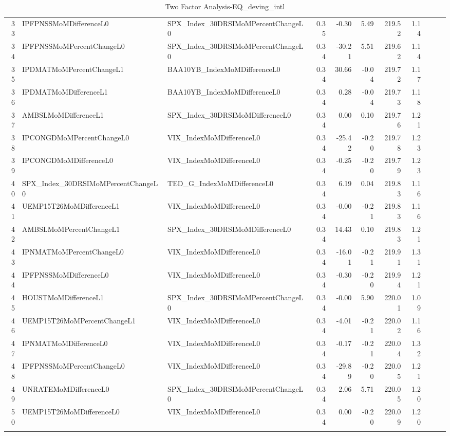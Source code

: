 \begin{longtable}{rllrrrrrlll}
  33 & IPFPNSSMoMDifferenceL0 & SPX\_Index\_30DRSIMoMPercentChangeL0 & 0.35 & -0.30 & 5.49 & 219.52 & 1.14 &  &  &  \\ 
  34 & IPFPNSSMoMPercentChangeL0 & SPX\_Index\_30DRSIMoMPercentChangeL0 & 0.34 & -30.21 & 5.51 & 219.62 & 1.14 &  &  &  \\ 
  35 & IPDMATMoMPercentChangeL1 & BAA10YB\_IndexMoMDifferenceL0 & 0.34 & 30.66 & -0.04 & 219.72 & 1.17 &  &  &  \\ 
  36 & IPDMATMoMDifferenceL1 & BAA10YB\_IndexMoMDifferenceL0 & 0.34 & 0.28 & -0.04 & 219.73 & 1.18 &  &  &  \\ 
  37 & AMBSLMoMDifferenceL1 & SPX\_Index\_30DRSIMoMDifferenceL0 & 0.34 & 0.00 & 0.10 & 219.76 & 1.21 &  &  &  \\ 
  38 & IPCONGDMoMPercentChangeL0 & VIX\_IndexMoMDifferenceL0 & 0.34 & -25.42 & -0.20 & 219.78 & 1.23 &  &  &  \\ 
  39 & IPCONGDMoMDifferenceL0 & VIX\_IndexMoMDifferenceL0 & 0.34 & -0.25 & -0.20 & 219.79 & 1.23 &  &  &  \\ 
  40 & SPX\_Index\_30DRSIMoMPercentChangeL0 & TED\_G\_IndexMoMDifferenceL0 & 0.34 & 6.19 & 0.04 & 219.83 & 1.16 &  &  &  \\ 
  41 & UEMP15T26MoMDifferenceL1 & VIX\_IndexMoMDifferenceL0 & 0.34 & -0.00 & -0.21 & 219.83 & 1.16 &  &  &  \\ 
  42 & AMBSLMoMPercentChangeL1 & SPX\_Index\_30DRSIMoMDifferenceL0 & 0.34 & 14.43 & 0.10 & 219.83 & 1.21 &  &  &  \\ 
  43 & IPNMATMoMPercentChangeL0 & VIX\_IndexMoMDifferenceL0 & 0.34 & -16.01 & -0.21 & 219.91 & 1.31 &  &  &  \\ 
  44 & IPFPNSSMoMDifferenceL0 & VIX\_IndexMoMDifferenceL0 & 0.34 & -0.30 & -0.20 & 219.94 & 1.21 &  &  &  \\ 
  45 & HOUSTMoMDifferenceL1 & SPX\_Index\_30DRSIMoMPercentChangeL0 & 0.34 & -0.00 & 5.90 & 220.01 & 1.09 &  &  &  \\ 
  46 & UEMP15T26MoMPercentChangeL1 & VIX\_IndexMoMDifferenceL0 & 0.34 & -4.01 & -0.21 & 220.02 & 1.16 &  &  &  \\ 
  47 & IPNMATMoMDifferenceL0 & VIX\_IndexMoMDifferenceL0 & 0.34 & -0.17 & -0.21 & 220.04 & 1.32 &  &  &  \\ 
  48 & IPFPNSSMoMPercentChangeL0 & VIX\_IndexMoMDifferenceL0 & 0.34 & -29.89 & -0.20 & 220.05 & 1.21 &  &  &  \\ 
  49 & UNRATEMoMDifferenceL0 & SPX\_Index\_30DRSIMoMPercentChangeL0 & 0.34 & 2.06 & 5.71 & 220.05 & 1.20 &  &  &  \\ 
  50 & UEMP15T26MoMDifferenceL0 & VIX\_IndexMoMDifferenceL0 & 0.34 & 0.00 & -0.20 & 220.09 & 1.20 &  &  &  \\ 
   \hline
\hline
\caption{Two Factor Analysis-EQ_deving_intl} 
\end{longtable}
